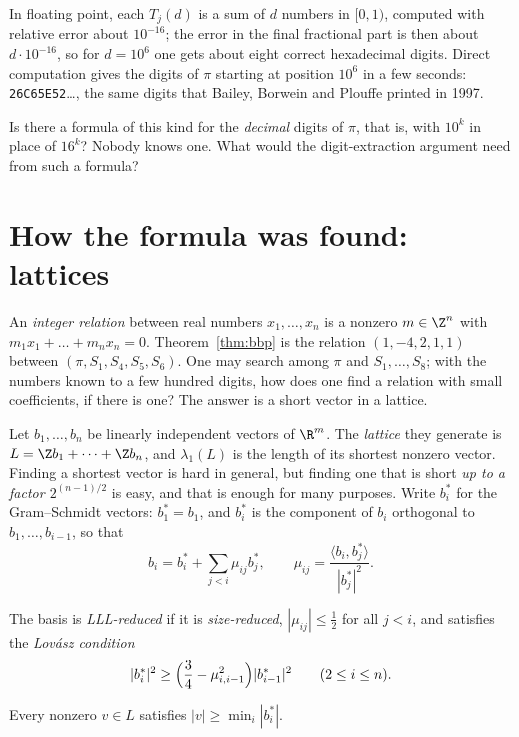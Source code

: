 In floating point, each $T_j(d)$ is a sum of $d$ numbers in $[0,1)$, computed with relative error about $10^{-16}$; the error in the final fractional part
is then about $d\cdot10^{-16}$, so for $d=10^6$ one gets about eight correct hexadecimal digits. Direct computation gives the digits of $\pi$ starting at position $10^6$ in a few seconds:
\texttt{26C65E52}\dots, the same digits that Bailey, Borwein and Plouffe printed in 1997.

\begin{think}
Is there a formula of this kind for the \emph{decimal} digits of $\pi$, that is, with $10^k$ in place of $16^k$? Nobody knows one. What would the
digit-extraction argument need from such a formula?
\end{think}

\section{How the formula was found: lattices}

An \emph{integer relation} between real numbers $x_1,\dots,x_n$ is a nonzero $m\in\Z^n$ with $m_1x_1+\dots+m_nx_n=0$. Theorem~\ref{thm:bbp} is the relation
$(1,-4,2,1,1)$ between $(\pi,S_1,S_4,S_5,S_6)$. One may search among $\pi$ and $S_1,\dots,S_8$; with the numbers known to a few hundred digits, how does one
find a relation with small coefficients, if there is one? The answer is a short vector in a lattice.

Let $b_1,\dots,b_n$ be linearly independent vectors of $\R^m$. The \emph{lattice} they generate is $L=\Z b_1+\dots+\Z b_n$, and $\lambda_1(L)$ is the length of its shortest nonzero vector.
Finding a shortest vector is hard in general, but finding one that is short \emph{up to a factor $2^{(n-1)/2}$} is easy, and that is enough for many purposes.
Write $b_i^*$ for the Gram--Schmidt vectors: $b_1^*=b_1$, and $b_i^*$ is the component of $b_i$ orthogonal to $b_1,\dots,b_{i-1}$, so that
\[
b_i=b_i^*+\sum_{j<i}\mu_{ij}b_j^*,\qquad\mu_{ij}=\frac{\langle b_i,b_j^*\rangle}{|b_j^*|^2}.
\]

\begin{definition}\label{def:lll}
The basis is \emph{LLL-reduced} if it is \emph{size-reduced}, $|\mu_{ij}|\le\frac12$ for all $j<i$, and satisfies the \emph{Lov\'asz condition}
\[
|b_i^*|^2\ge\Bigl(\frac34-\mu_{i,i-1}^2\Bigr)|b_{i-1}^*|^2\qquad(2\le i\le n).
\]
\end{definition}

\begin{lemma}\label{lem:gsbound}
Every nonzero $v\in L$ satisfies $|v|\ge\min_i|b_i^*|$.
\end{lemma}

